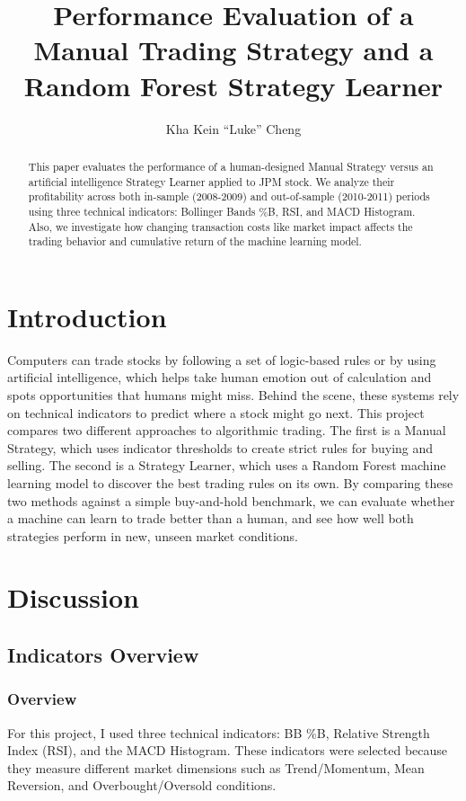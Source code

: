 \documentclass[
	letterpaper, %
]{jdf}
\author{Kha Kein “Luke” Cheng}
\title{Performance Evaluation of a Manual Trading Strategy and a Random Forest Strategy Learner}
\begin{document}

\maketitle

\begin{abstract}
	This paper evaluates the performance of a human-designed Manual Strategy versus an artificial intelligence Strategy Learner applied to JPM stock. We analyze their profitability across both in-sample (2008-2009) and out-of-sample (2010-2011) periods using three technical indicators: Bollinger Bands \%B, RSI, and MACD Histogram. Also, we investigate how changing transaction costs like market impact affects the trading behavior and cumulative return of the machine learning model.
\end{abstract}

\section{Introduction}
Computers can trade stocks by following a set of logic-based rules or by using artificial intelligence, which helps take human emotion out of calculation and spots opportunities that humans might miss. Behind the scene, these systems rely on technical indicators to predict where a stock might go next. This project compares two different approaches to algorithmic trading. The first is a Manual Strategy, which uses indicator thresholds to create strict rules for buying and selling. The second is a Strategy Learner, which uses a Random Forest machine learning model to discover the best trading rules on its own. By comparing these two methods against a simple buy-and-hold benchmark, we can evaluate whether a machine can learn to trade better than a human, and see how well both strategies perform in new, unseen market conditions.

\section{Discussion}
\subsection{Indicators Overview}
\subsubsection{Overview}

For this project, I used three technical indicators: BB \%B, Relative Strength Index (RSI), and the MACD Histogram. These indicators were selected because they measure different market dimensions such as Trend/Momentum, Mean Reversion, and Overbought/Oversold conditions.
\end{document}
